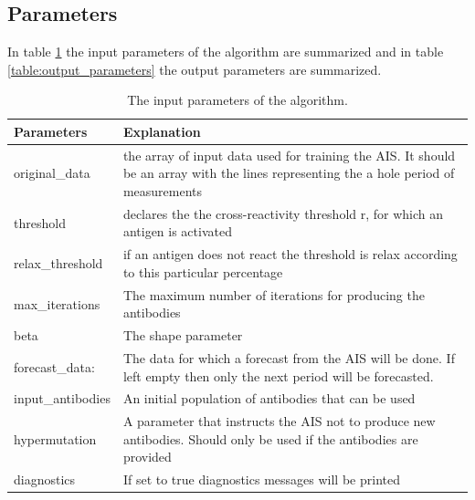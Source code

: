 \documentclass{assignment}
\begin{document}
\subsection{Parameters}

In table \ref{table:input_parameters} the input parameters of the algorithm are summarized and in table \ref{table:output_parameters} the output parameters are summarized.

\begin{table}
\begin{center}
  \begin{tabular}{|m{}|m{}|}
    \hline
    {\bf Parameters} & {\bf Explanation}\\ \hline \hline

	original\_data & the array of input data used for training the AIS. It should be an array with the lines representing the a hole period of measurements  \\ \hline

	threshold & declares the the cross-reactivity threshold r, for which an antigen is activated  \\ \hline

	relax\_threshold & if an antigen does not react the threshold is relax according to this particular percentage  \\ \hline

	max\_iterations & The maximum number of iterations for producing the antibodies \\ \hline

	beta & The shape parameter \\ \hline

	forecast\_data: & The data for which a forecast from the AIS will be done. If left empty then only the next period will be forecasted. \\ \hline

	input\_antibodies & An initial population of antibodies that can be used \\ \hline

	hypermutation & A parameter that instructs the AIS not to produce new antibodies. Should only be used if the antibodies are provided \\ \hline

	diagnostics & If set to true diagnostics messages will be printed  \\ \hline	

\hline \hline
  \end{tabular}
\caption{The input parameters of the algorithm.}
\label{table:input_parameters}
\end{center}
\end{table}
\end{document}
